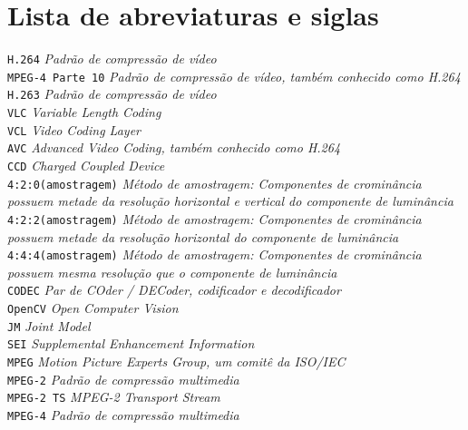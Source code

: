 
\chapter*{Lista de abreviaturas e siglas}

\noindent
\verb"H.264" \dotfill \textit{Padrão de compressão de vídeo}\\
\verb"MPEG-4 Parte 10" \dotfill \textit{Padrão de compressão de vídeo, também conhecido como H.264}\\
\verb"H.263" \dotfill \textit{Padrão de compressão de vídeo}\\
\verb"VLC" \dotfill \textit{Variable Length Coding}\\
\verb"VCL" \dotfill \textit{Video Coding Layer}\\
\verb"AVC" \dotfill \textit{Advanced Video Coding, também conhecido como H.264}\\
\verb"CCD" \dotfill \textit{Charged Coupled Device}\\
\verb"4:2:0(amostragem)" \dotfill \textit{Método de amostragem: Componentes de crominância possuem metade da resolução horizontal e vertical do componente de luminância}\\
\verb"4:2:2(amostragem)" \dotfill \textit{Método de amostragem: Componentes de crominância possuem metade da resolução horizontal do componente de luminância}\\
\verb"4:4:4(amostragem)" \dotfill \textit{Método de amostragem: Componentes de crominância possuem mesma resolução que o componente de luminância}\\
\verb"CODEC" \dotfill \textit{Par de COder / DECoder, codificador e decodificador}\\
\verb"OpenCV" \dotfill \textit{Open Computer Vision}\\
\verb"JM" \dotfill \textit{Joint Model}\\
\verb"SEI" \dotfill \textit{Supplemental Enhancement Information}\\
\verb"MPEG" \dotfill \textit{Motion Picture Experts Group, um comitê da ISO/IEC}\\
\verb"MPEG-2" \dotfill \textit{Padrão de compressão multimedia}\\
\verb"MPEG-2 TS" \dotfill \textit{MPEG-2 Transport Stream}\\
\verb"MPEG-4" \dotfill \textit{Padrão de compressão multimedia}\\
